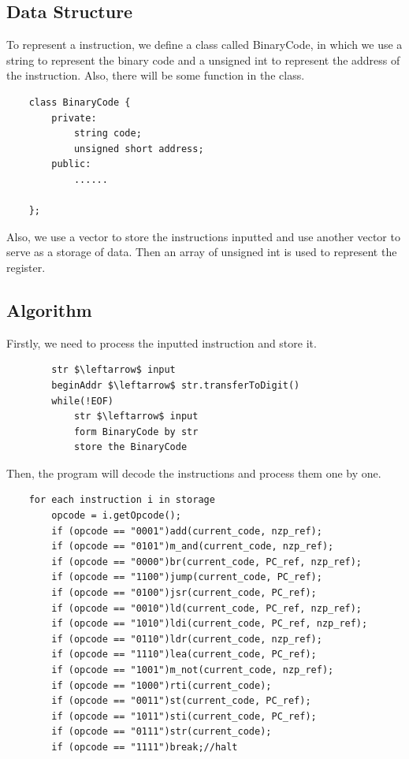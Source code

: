 \documentclass[twoside]{article}
\begin{document}
\begin{CJK*}{UTF8}{gbsn}
	\subsection{Data Structure}
	
	To represent a instruction, we define a class called BinaryCode, in which we use a string to represent the binary code and a unsigned int to represent the address of the instruction. Also, there will be some function in the class.
	
	\begin{lstlisting}
	class BinaryCode {
		private:
			string code;
			unsigned short address;
		public:
			......
			
	};
	\end{lstlisting}

	Also, we use a vector to store the instructions inputted and use another vector to serve as a storage of data. Then an array of unsigned int is used to represent the register.
	
	\subsection{Algorithm}
	
	Firstly, we need to process the inputted instruction and store it.
	
	\begin{lstlisting}
		str $\leftarrow$ input
		beginAddr $\leftarrow$ str.transferToDigit()
		while(!EOF)
			str $\leftarrow$ input
			form BinaryCode by str
			store the BinaryCode
	\end{lstlisting}

	
	Then, the program will decode the instructions and process them one by one.
	
	\begin{lstlisting}
	for each instruction i in storage
		opcode = i.getOpcode();
		if (opcode == "0001")add(current_code, nzp_ref);
		if (opcode == "0101")m_and(current_code, nzp_ref);
		if (opcode == "0000")br(current_code, PC_ref, nzp_ref);
		if (opcode == "1100")jump(current_code, PC_ref);
		if (opcode == "0100")jsr(current_code, PC_ref);
		if (opcode == "0010")ld(current_code, PC_ref, nzp_ref);
		if (opcode == "1010")ldi(current_code, PC_ref, nzp_ref);
		if (opcode == "0110")ldr(current_code, nzp_ref);
		if (opcode == "1110")lea(current_code, PC_ref);
		if (opcode == "1001")m_not(current_code, nzp_ref);
		if (opcode == "1000")rti(current_code);
		if (opcode == "0011")st(current_code, PC_ref);
		if (opcode == "1011")sti(current_code, PC_ref);
		if (opcode == "0111")str(current_code);
		if (opcode == "1111")break;//halt
	\end{lstlisting}


\end{CJK*}
\end{document}
